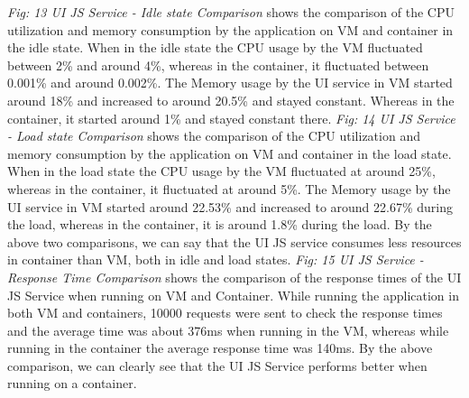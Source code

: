 \emph{Fig: 13 UI JS Service - Idle state Comparison} shows the comparison of the CPU utilization and memory consumption by the application on VM and container in the idle state. When in the idle state the CPU usage by the VM fluctuated between 2\% and around 4\%, whereas in the container, it fluctuated between 0.001\% and around 0.002\%. The Memory usage by the UI service in VM started around 18\% and increased to around 20.5\% and stayed constant. Whereas in the container, it started around 1\% and stayed constant there. \emph{Fig: 14 UI JS Service - Load state Comparison} shows the comparison of the CPU utilization and memory consumption by the application on VM and container in the load state. When in the load state the CPU usage by the VM fluctuated at around 25\%, whereas in the container, it fluctuated at around 5\%. The Memory usage by the UI service in VM started around 22.53\% and increased to around 22.67\% during the load, whereas in the container, it is around 1.8\% during the load. By the above two comparisons, we can say that the UI JS service consumes less resources in container than VM, both in idle and load states. \emph{Fig: 15 UI JS Service - Response Time Comparison} shows the comparison of the response times of the UI JS Service when running on VM and Container. While running the application in both VM and containers, 10000 requests were sent to check the response times and the average time was about 376ms when running in the VM, whereas while running in the container the average response time was 140ms. By the above comparison, we can clearly see that the UI JS Service performs better when running on a container.

